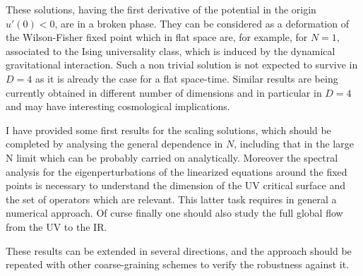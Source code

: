 These solutions, having the first derivative of the potential in the origin $u'(0)<0$, are in a broken phase.
They can be considered as a deformation of the Wilson-Fisher fixed point which in flat space are, for example, for $N=1$, associated to the Ising universality class, which is induced by the dynamical gravitational interaction.
Such a non trivial solution is not expected to survive in $D=4$ as it is already the case for a flat space-time.
Similar results are being currently obtained in different number of dimensions and in particular in $D=4$ and may have interesting cosmological implications.

I have provided some first results for the scaling solutions, which should be completed by analysing the general dependence in $N$, 
including that in the large N limit which can be probably carried on analytically. Moreover the spectral analysis for the eigenperturbations of the 
linearized equations around the fixed points is necessary to understand the dimension of the UV critical surface and the set of operators which are relevant. 
This latter task requires in general a numerical approach. Of curse finally one should also study the full global flow from the UV to the IR.

These results can be extended in several directions, and the approach should be repeated with other coarse-graining schemes to verify the robustness against it.
